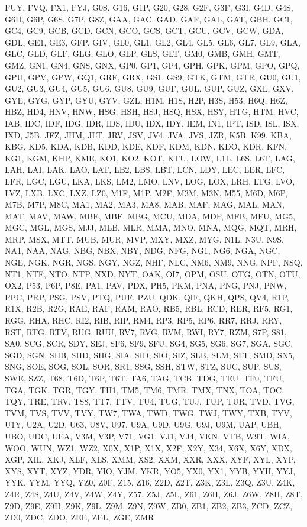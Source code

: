 \documentclass[10pt]{article}
\begin{document}
FUY, FVQ, FX1, FYJ, G0S, G16, G1P, G20, G28, G2F, G3F, G3I, G4D, G4S, G6D, G6P, G6S, G7P, G8Z, GAA, GAC, GAD, GAF, GAL, GAT, GBH, GC1, GC4, GC9, GCB, GCD, GCN, GCO, GCS, GCT, GCU, GCV, GCW, GDA, GDL, GE1, GE3, GFP, GIV, GL0, GL1, GL2, GL4, GL5, GL6, GL7, GL9, GLA, GLC, GLD, GLF, GLG, GLO, GLP, GLS, GLT, GM0, GMB, GMH, GMT, GMZ, GN1, GN4, GNS, GNX, GP0, GP1, GP4, GPH, GPK, GPM, GPO, GPQ, GPU, GPV, GPW, GQ1, GRF, GRX, GS1, GS9, GTK, GTM, GTR, GU0, GU1, GU2, GU3, GU4, GU5, GU6, GU8, GU9, GUF, GUL, GUP, GUZ, GXL, GXV, GYE, GYG, GYP, GYU, GYV, GZL, H1M, H1S, H2P, H3S, H53, H6Q, H6Z, HBZ, HD4, HNV, HNW, HSG, HSH, HSJ, HSQ, HSX, HSY, HTG, HTM, HVC, IAB, IDC, IDF, IDG, IDR, IDS, IDU, IDX, IDY, IEM, IN1, IPT, ISD, ISL, ISX, IXD, J5B, JFZ, JHM, JLT, JRV, JSV, JV4, JVA, JVS, JZR, K5B, K99, KBA, KBG, KD5, KDA, KDB, KDD, KDE, KDF, KDM, KDN, KDO, KDR, KFN, KG1, KGM, KHP, KME, KO1, KO2, KOT, KTU, LOW, L1L, L6S, L6T, LAG, LAH, LAI, LAK, LAO, LAT, LB2, LBS, LBT, LCN, LDY, LEC, LER, LFC, LFR, LGC, LGU, LKA, LKS, LM2, LMO, LNV, LOG, LOX, LRH, LTG, LVO, LVZ, LXB, LXC, LXZ, LZ0, M1F, M1P, M2F, M3M, M3N, M55, M6D, M6P, M7B, M7P, M8C, MA1, MA2, MA3, MA8, MAB, MAF, MAG, MAL, MAN, MAT, MAV, MAW, MBE, MBF, MBG, MCU, MDA, MDP, MFB, MFU, MG5, MGC, MGL, MGS, MJJ, MLB, MLR, MMA, MNO, MNA, MQG, MQT, MRH, MRP, MSX, MTT, MUB, MUR, MVP, MXY, MXZ, MYG, N1L, N3U, N9S, NA1, NAA, NAG, NBG, NBX, NBY, NDG, NFG, NG1, NG6, NGA, NGC, NGE, NGK, NGR, NGS, NGY, NGZ, NHF, NLC, NM6, NM9, NNG, NPF, NSQ, NT1, NTF, NTO, NTP, NXD, NYT, OAK, OI7, OPM, OSU, OTG, OTN, OTU, OX2, P53, P6P, P8E, PA1, PAV, PDX, PH5, PKM, PNA, PNG, PNJ, PNW, PPC, PRP, PSG, PSV, PTQ, PUF, PZU, QDK, QIF, QKH, QPS, QV4, R1P, R1X, R2B, R2G, RAE, RAF, RAM, RAO, RB5, RBL, RCD, RER, RF5, RG1, RGG, RHA, RHC, RI2, RIB, RIP, RM4, RP3, RP5, RP6, RR7, RRJ, RRY, RST, RTG, RTV, RUG, RUU, RV7, RVG, RVM, RWI, RY7, RZM, S7P, S81, SA0, SCG, SCR, SDY, SEJ, SF6, SF9, SFU, SG4, SG5, SG6, SG7, SGA, SGC, SGD, SGN, SHB, SHD, SHG, SIA, SID, SIO, SIZ, SLB, SLM, SLT, SMD, SN5, SNG, SOE, SOG, SOL, SOR, SR1, SSG, SSH, STW, STZ, SUC, SUP, SUS, SWE, SZZ, T68, T6D, T6P, T6T, TA6, TAG, TCB, TDG, TEU, TF0, TFU, TGA, TGK, TGR, TGY, TH1, TM5, TM6, TMR, TMX, TNX, TOA, TOC, TQY, TRE, TRV, TS8, TT7, TTV, TU4, TUG, TUJ, TUP, TUR, TVD, TVG, TVM, TVS, TVV, TVY, TW7, TWA, TWD, TWG, TWJ, TWY, TXB, TYV, U1Y, U2A, U2D, U63, U8V, U97, U9A, U9D, U9G, U9J, U9M, UAP, UBH, UBO, UDC, UEA, V3M, V3P, V71, VG1, VJ1, VJ4, VKN, VTB, W9T, WIA, WOO, WUN, WZ1, WZ2, X0X, X1P, X1X, X2F, X2Y, X34, X6X, X6Y, XDX, XGP, XIL, XKJ, XLF, XLS, XMM, XS2, XXM, XXR, XXX, XYF, XYL, XYP, XYS, XYT, XYZ, YDR, YIO, YJM, YKR, YO5, YX0, YX1, YYB, YYH, YYJ, YYK, YYM, YYQ, YZ0, Z0F, Z15, Z16, Z2D, Z2T, Z3K, Z3L, Z3Q, Z3U, Z4K, Z4R, Z4S, Z4U, Z4V, Z4W, Z4Y, Z57, Z5J, Z5L, Z61, Z6H, Z6J, Z6W, Z8H, Z8T, Z9D, Z9E, Z9H, Z9K, Z9L, Z9M, Z9N, Z9W, ZB0, ZB1, ZB2, ZB3, ZCD, ZCZ, ZD0, ZDC, ZDO, ZEE, ZEL, ZGE, ZMR
\end{document}
